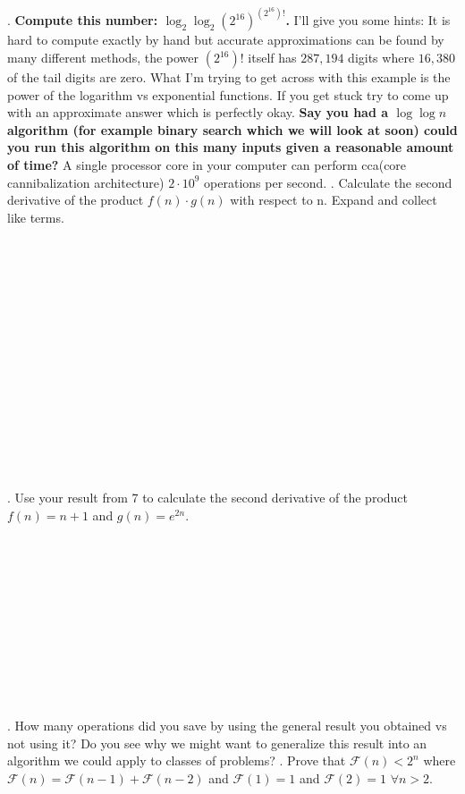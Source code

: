 \documentclass[12pt]{article}
\begin{document}
\newpage
{}. \textbf{Compute this number: $\log_{2}{\log_{2}{(2^{16})^{(2^{16})!}}}$.} I'll give you some hints:
It is hard to compute exactly by hand but accurate approximations can be found by many different methods, the power $(2^{16})!$ itself has $287,194$ digits where $16,380$ of the tail digits are zero.
What I'm trying to get across with this example is the power of the logarithm vs exponential functions. If you get stuck try to come up
with an approximate answer which is perfectly okay. \textbf{Say you had a $\log{\log{n}}$ algorithm (for example binary search 
which we will look at soon) could you
run this algorithm on this many inputs given a reasonable amount of time?} A single processor core in your computer can perform cca(core cannibalization architecture) $2 \cdot 10^9$ operations per second.
\newpage
{}. Calculate the second derivative of the product $f(n) \cdot g(n)$ with respect to n. Expand and collect like terms.\\\\\\\\\\\\\\\\\\\\\\\\\\\\\\\\
. Use your result from 7 to calculate the second derivative of the product $f(n) = n + 1$ and $g(n)=e^{2n}$.\\\\\\\\\\\\\\\\\\\\\\\\
. How many operations did you save by using the general result you obtained vs not using it? Do you see why we might want to generalize this result into an algorithm we could apply to classes of problems?
\newpage
{}.  Prove that $\mathscr{F}(n) < 2^n$ where $\mathscr{F}(n) = \mathscr{F}(n-1) + \mathscr{F}(n-2)$ and $\mathscr{F}(1)=1$ and $\mathscr{F}(2) = 1$ $\forall n > 2$. 
\end{document}
